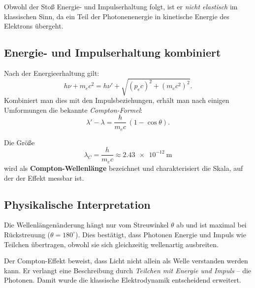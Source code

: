 \begin{HinweisBox}
	Obwohl der Stoß Energie- und Impulserhaltung folgt, 
	ist er \emph{nicht elastisch} im klassischen Sinn, 
	da ein Teil der Photonenenergie in kinetische Energie des Elektrons übergeht.
\end{HinweisBox}

\subsection{Energie- und Impulserhaltung kombiniert}
Nach der Energieerhaltung gilt:
\[
h\nu + m_e c^2 = h\nu' + \sqrt{(p_e c)^2 + (m_e c^2)^2}.
\]
Kombiniert man dies mit den Impulsbeziehungen, 
erhält man nach einigen Umformungen die bekannte \emph{Compton-Formel}:
\[
\lambda' - \lambda = \frac{h}{m_e c}\,(1 - \cos\theta).
\]

\begin{MatheBox}
	Die Größe
	\[
	\lambda_C = \frac{h}{m_e c} \approx \SI{2.43e-12}{\meter}
	\]
	wird als \textbf{Compton-Wellenlänge} bezeichnet 
	und charakterisiert die Skala, auf der der Effekt messbar ist.
\end{MatheBox}

\subsection{Physikalische Interpretation}
Die Wellenlängenänderung hängt nur vom Streuwinkel \( \theta \) ab 
und ist maximal bei Rückstreuung (\( \theta = 180^\circ \)). 
Dies bestätigt, dass Photonen Energie und Impuls wie Teilchen übertragen, 
obwohl sie sich gleichzeitig wellenartig ausbreiten.

\begin{DidaktikBox}
	Der Compton-Effekt beweist, dass Licht nicht allein als Welle verstanden werden kann. 
	Er verlangt eine Beschreibung durch \emph{Teilchen mit Energie und Impuls} – 
	die Photonen. Damit wurde die klassische Elektrodynamik entscheidend erweitert.
\end{DidaktikBox}
